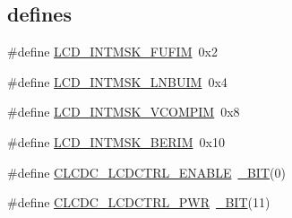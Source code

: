 \subsection*{\textquotesingle{}defines\textquotesingle{}}
\begin{DoxyCompactItemize}
\item 
\#define \hyperlink{group___l_c_d__18_x_x__43_x_x_gae2537e91c439a06b08c27e63c8639fd8}{L\+C\+D\+\_\+\+I\+N\+T\+M\+S\+K\+\_\+\+F\+U\+F\+IM}~0x2
\item 
\#define \hyperlink{group___l_c_d__18_x_x__43_x_x_gafc1a133f89801ad8c911d73e213d7349}{L\+C\+D\+\_\+\+I\+N\+T\+M\+S\+K\+\_\+\+L\+N\+B\+U\+IM}~0x4
\item 
\#define \hyperlink{group___l_c_d__18_x_x__43_x_x_ga6c78481d9b993bd0247c53e5b182ab49}{L\+C\+D\+\_\+\+I\+N\+T\+M\+S\+K\+\_\+\+V\+C\+O\+M\+P\+IM}~0x8
\item 
\#define \hyperlink{group___l_c_d__18_x_x__43_x_x_ga806f8a96720000a09b6de988d3d46291}{L\+C\+D\+\_\+\+I\+N\+T\+M\+S\+K\+\_\+\+B\+E\+R\+IM}~0x10
\item 
\#define \hyperlink{group___l_c_d__18_x_x__43_x_x_ga1ccec80860d0fac10278a3b13092152b}{C\+L\+C\+D\+C\+\_\+\+L\+C\+D\+C\+T\+R\+L\+\_\+\+E\+N\+A\+B\+LE}~\hyperlink{group___l_p_c___types___public___macros_ga7ee022f5e5a971a8324e4b7572d49170}{\+\_\+\+B\+IT}(0)
\item 
\#define \hyperlink{group___l_c_d__18_x_x__43_x_x_gade9e578fe44d385674e0b9f932bf8bdb}{C\+L\+C\+D\+C\+\_\+\+L\+C\+D\+C\+T\+R\+L\+\_\+\+P\+WR}~\hyperlink{group___l_p_c___types___public___macros_ga7ee022f5e5a971a8324e4b7572d49170}{\+\_\+\+B\+IT}(11)
\end{DoxyCompactItemize}
